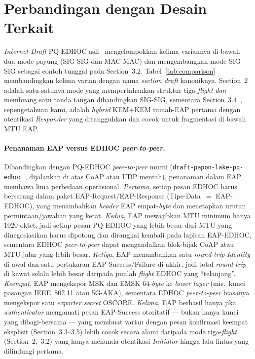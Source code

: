 \documentclass{easychair}
\newcommand{\VarSec}[1]{Section~#1~\cite{pq-edhoc-draft}}
\begin{document}
\section{Perbandingan dengan Desain Terkait}
\label{sec:comparison}
\emph{Internet-Draft} PQ-EDHOC asli~\cite{pq-edhoc-draft}
mengelompokkan kelima variannya di bawah dua mode payung (SIG-SIG dan
MAC-MAC) dan mengembangkan mode SIG-SIG sebagai contoh tunggal pada
Section~3.2. Tabel~\ref{tab:comparison} membandingkan kelima varian
dengan nama \emph{section} \emph{draft} kanoniknya. \VarSec{2} adalah
satu-satunya mode yang mempertahankan struktur tiga-\emph{flight}
\emph{dan} membuang satu tanda tangan dibandingkan SIG-SIG, sementara
\VarSec{3.4}, sepengetahuan kami, adalah \emph{hybrid} KEM+KEM ramah-EAP
pertama dengan otentikasi \emph{Responder} yang ditangguhkan dan cocok
untuk fragmentasi di bawah MTU EAP.

\paragraph{Penanaman EAP versus EDHOC \emph{peer-to-peer}.}
Dibandingkan dengan PQ-EDHOC \emph{peer-to-peer} murni
(\texttt{draft-papon-lake-pq-edhoc}~\cite{pq-edhoc-draft}, dijalankan
di atas CoAP atau UDP mentah), penanaman dalam EAP membawa lima
perbedaan operasional. \emph{Pertama}, setiap pesan EDHOC harus
bersarang dalam paket EAP-Request/EAP-Response (Tipe-Data~$=$
EAP-EDHOC), yang menambahkan \emph{header} EAP empat-\emph{byte} dan
menetapkan urutan permintaan/jawaban yang ketat. \emph{Kedua}, EAP
mewajibkan MTU minimum hanya $1020$ oktet, jadi setiap pesan PQ-EDHOC
yang lebih besar dari MTU yang dinegosiasikan harus dipotong dan
dirangkai kembali pada lapisan EAP-EDHOC, sementara EDHOC
\emph{peer-to-peer} dapat mengandalkan blok-bijak CoAP atau MTU jalur
yang lebih besar. \emph{Ketiga}, EAP menambahkan satu \emph{round-trip}
\emph{Identity} di awal dan satu pertukaran EAP-Success/Failure di
akhir, jadi total \emph{round-trip} di kawat selalu lebih besar
daripada jumlah \emph{flight} EDHOC yang \enquote{telanjang}.
\emph{Keempat}, EAP mengekspor MSK dan EMSK 64-\emph{byte} ke
\emph{lower layer} (mis.\ kunci pasangan IEEE~802.11 atau 5G-AKA),
sementara EDHOC \emph{peer-to-peer} biasanya mengekspor satu
\emph{exporter secret} OSCORE. \emph{Kelima}, EAP berhasil hanya jika
\emph{authenticator} mengamati pesan EAP-Success otoritatif --- bukan
hanya kunci yang dibagi-bersama --- yang membuat varian dengan pesan
konfirmasi keempat eksplisit (Section~3.3--3.5) lebih cocok secara
alami daripada mode tiga-\emph{flight} (Section~2,~3.2) yang hanya
menunda otentikasi \emph{Initiator} hingga lalu lintas yang
dilindungi pertama.
\end{document}
